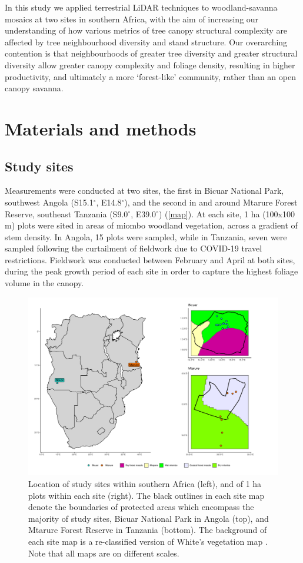 \documentclass[11pt,a4paper]{article}
\begin{document}
In this study we applied terrestrial LiDAR techniques to woodland-savanna mosaics at two sites in southern Africa, with the aim of increasing our understanding of how various metrics of tree canopy structural complexity are affected by tree neighbourhood diversity and stand structure. Our overarching contention is that neighbourhoods of greater tree diversity and greater structural diversity allow greater canopy complexity and foliage density, resulting in higher productivity, and ultimately a more `forest-like' community, rather than an open canopy savanna.

\section{Materials and methods}

\subsection{Study sites}

Measurements were conducted at two sites, the first in Bicuar National Park, southwest Angola (S15.1$^\circ$, E14.8$^\circ$), and the second in and around Mtarure Forest Reserve, southeast Tanzania (S9.0$^\circ$, E39.0$^\circ$) (\autoref{map}). At each site, 1 ha (100x100 m) plots were sited in areas of miombo woodland vegetation, across a gradient of stem density. In Angola, 15 plots were sampled, while in Tanzania, seven were sampled following the curtailment of fieldwork due to COVID-19 travel restrictions. Fieldwork was conducted between February and April at both sites, during the peak growth period of each site in order to capture the highest foliage volume in the canopy.

\begin{figure}[H]
\centering
	\includegraphics[width=\textwidth]{map}
	\caption{Location of study sites within southern Africa (left), and of 1 ha plots within each site (right). The black outlines in each site map denote the boundaries of protected areas which encompass the majority of study sites, Bicuar National Park in Angola (top), and Mtarure Forest Reserve in Tanzania (bottom). The background of each site map is a re-classified version of White's vegetation map \citep{White1983}. Note that all maps are on different scales.}
	\label{map}
\end{figure}
\end{document}
